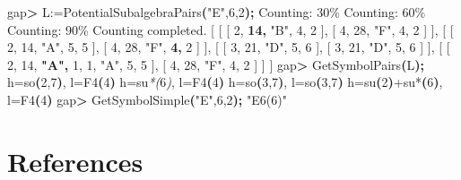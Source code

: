 \documentclass[
]{article}
\newenvironment{Shaded}{\begin{snugshade}}{\end{snugshade}}
\newcommand{\BuiltInTok}[1]{#1}
\newcommand{\ErrorTok}[1]{\textcolor[rgb]{0.64,0.00,0.00}{\textbf{#1}}}
\newcommand{\ExtensionTok}[1]{#1}
\newcommand{\KeywordTok}[1]{\textcolor[rgb]{0.13,0.29,0.53}{\textbf{#1}}}
\newcommand{\NormalTok}[1]{#1}
\newcommand{\OperatorTok}[1]{\textcolor[rgb]{0.81,0.36,0.00}{\textbf{#1}}}
\newcommand{\PreprocessorTok}[1]{\textcolor[rgb]{0.56,0.35,0.01}{\textit{#1}}}
\newcommand{\StringTok}[1]{\textcolor[rgb]{0.31,0.60,0.02}{#1}}
\newcommand{\VariableTok}[1]{\textcolor[rgb]{0.00,0.00,0.00}{#1}}
\begin{document}
\begin{Shaded}
\begin{Highlighting}[]
\ExtensionTok{gap}\OperatorTok{\textgreater{}}\NormalTok{ L:=PotentialSubalgebraPairs}\ErrorTok{(}\StringTok{"E"}\ExtensionTok{,6,2}\KeywordTok{);}
\ExtensionTok{Counting:}\NormalTok{ 30\%}
\ExtensionTok{Counting:}\NormalTok{ 60\%}
\ExtensionTok{Counting:}\NormalTok{ 90\%}
\ExtensionTok{Counting}\NormalTok{ completed.}
\BuiltInTok{[}\NormalTok{ [ [ 2, }\ErrorTok{14,} \StringTok{"B"}\NormalTok{, 4, 2 ], [ 4, 28, }\StringTok{"F"}\NormalTok{, 4, 2 ] ], [ [ 2, 14, }\StringTok{"A"}\NormalTok{, 5, 5 ], }
\BuiltInTok{[}\NormalTok{ 4, 28, }\StringTok{"F"}\NormalTok{, }\ErrorTok{4,}\NormalTok{ 2 ] ], [ [ 3, 21, }\StringTok{"D"}\NormalTok{, 5, 6 ], [ 3, 21, }\StringTok{"D"}\NormalTok{, 5, 6 ] ],}
\BuiltInTok{[}\NormalTok{ [ 2, 14, }\ErrorTok{"A",}\NormalTok{ 1, 1, }\StringTok{"A"}\NormalTok{, 5, 5 ], [ 4, 28, }\StringTok{"F"}\NormalTok{, 4, 2 ] ] ]}
\ExtensionTok{gap}\OperatorTok{\textgreater{}}\NormalTok{ GetSymbolPairs}\ErrorTok{(}\ExtensionTok{L}\KeywordTok{);}
\VariableTok{h=}\NormalTok{so}\KeywordTok{(}\ExtensionTok{2,7}\KeywordTok{)}\ExtensionTok{,}\NormalTok{ l=F4}\ErrorTok{(}\ExtensionTok{4}\KeywordTok{)}
\VariableTok{h=}\NormalTok{su}\PreprocessorTok{*(}\NormalTok{6}\PreprocessorTok{)}\NormalTok{, }\VariableTok{l=}\NormalTok{F4}\KeywordTok{(}\ExtensionTok{4}\KeywordTok{)}
\VariableTok{h=}\NormalTok{so}\KeywordTok{(}\ExtensionTok{3,7}\KeywordTok{)}\ExtensionTok{,}\NormalTok{ l=so}\ErrorTok{(}\ExtensionTok{3,7}\KeywordTok{)}
\VariableTok{h=}\NormalTok{su}\KeywordTok{(}\ExtensionTok{2}\KeywordTok{)}\ExtensionTok{+su*}\ErrorTok{(}\ExtensionTok{6}\KeywordTok{)}\ExtensionTok{,}\NormalTok{ l=F4}\ErrorTok{(}\ExtensionTok{4}\KeywordTok{)}
\ExtensionTok{gap}\OperatorTok{\textgreater{}}\NormalTok{ GetSymbolSimple}\ErrorTok{(}\StringTok{"E"}\ExtensionTok{,6,2}\KeywordTok{);}
\StringTok{"E6(6)"}
\end{Highlighting}
\end{Shaded}

\hypertarget{references}{%
\section*{References}\label{references}}
\end{document}
